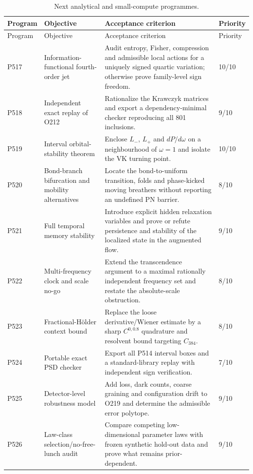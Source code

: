 \documentclass[11pt,a4paper]{article}
\theoremstyle{definition}
\theoremstyle{remark}
\begin{document}
\begin{longtable}{@{}p{}p{}p{}p{}@{}}
\caption{Next analytical and small-compute programmes.}\\
\toprule
Program & Objective & Acceptance criterion & Priority\\
\midrule
\endfirsthead
\toprule
Program & Objective & Acceptance criterion & Priority\\
\midrule
\endhead
P517 & Information-functional fourth-order jet & Audit entropy, Fisher, compression and admissible local actions for a uniquely signed quartic variation; otherwise prove family-level sign freedom. & 10/10\\
P518 & Independent exact replay of O212 & Rationalize the Krawczyk matrices and export a dependency-minimal checker reproducing all 801 inclusions. & 9/10\\
P519 & Interval orbital-stability theorem & Enclose $L_-$, $L_+$ and $dP/d\omega$ on a neighbourhood of $\omega=1$ and isolate the VK turning point. & 10/10\\
P520 & Bond-branch bifurcation and mobility alternatives & Locate the bond-to-uniform transition, folds and phase-kicked moving breathers without reporting an undefined PN barrier. & 8/10\\
P521 & Full temporal memory stability & Introduce explicit hidden relaxation variables and prove or refute persistence and stability of the localized state in the augmented flow. & 9/10\\
P522 & Multi-frequency clock and scale no-go & Extend the transcendence argument to a maximal rationally independent frequency set and restate the absolute-scale obstruction. & 8/10\\
P523 & Fractional-Hölder context bound & Replace the loose derivative/Wiener estimate by a sharp $C^{0,0.8}$ quadrature and resolvent bound targeting $C_{384}$. & 8/10\\
P524 & Portable exact PSD checker & Export all P514 interval boxes and a standard-library replay with independent sign verification. & 7/10\\
P525 & Detector-level robustness model & Add loss, dark counts, coarse graining and configuration drift to O219 and determine the admissible error polytope. & 9/10\\
P526 & Law-class selection/no-free-lunch audit & Compare competing low-dimensional parameter laws with frozen synthetic hold-out data and prove what remains prior-dependent. & 9/10\\
\bottomrule
\end{longtable}
\end{document}
